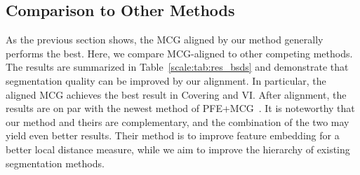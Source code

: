 \subsection{Comparison to Other Methods}
As the previous section shows, the MCG aligned by our method generally
performs the best. Here, we compare MCG-aligned to other competing
methods. The results are summarized in Table~\ref{scale:tab:res_bsds} and
demonstrate that segmentation quality can be improved by our
alignment. In particular, the aligned MCG achieves the best result in
Covering and VI. After alignment, the results are on
par with the newest method of PFE+MCG~\citep{yupiecewise}. It is
noteworthy that our method and theirs are complementary, and the
combination of the two may yield even better results. Their method is
to improve feature embedding for a better local distance measure,
while we aim to improve the hierarchy of existing segmentation methods. 




